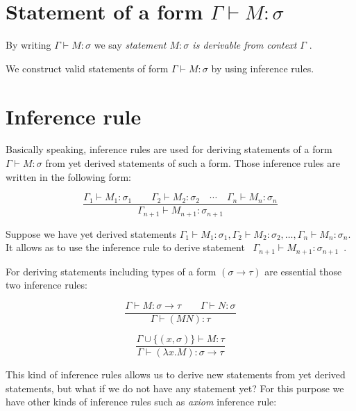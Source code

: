 \documentclass[12pt,a4paper]{report}
\begin{document}
	
	
\section{Statement of a form $\Gamma \vdash M : \sigma$}

	By writing $\Gamma \vdash M : \sigma$ we say 
	{\it statement $M : \sigma$ is derivable from context $\Gamma$ }.

	We construct valid statements of form $\Gamma \vdash M : \sigma$ by using inference rules.
	
		
\section{Inference rule}		
	
	Basically speaking, inference rules are used for deriving statements of a form 
	$\Gamma \vdash M : \sigma$ from yet derived statements of such a form.
	Those inference rules are written in the following form:
	
	\begin{equation*}
		\frac{\Gamma_1 \vdash M_1 : \sigma_1 \qquad
			  \Gamma_2 \vdash M_2 : \sigma_2 \quad
			  \dotsm \quad
		      \Gamma_n \vdash M_n : \sigma_n}
		     {\Gamma_{n+1} \vdash M_{n+1} : \sigma_{n+1}}
	\end{equation*}	
	
	Suppose we have yet derived statements 
	$\Gamma_1 \vdash M_1 : \sigma_1 ,
	 \Gamma_2 \vdash M_2 : \sigma_2 ,
	 \dots ,
	 \Gamma_n \vdash M_n : \sigma_n$. 
	It allows as to use the inference rule to derive statement
	\mbox{ $\Gamma_{n+1} \vdash M_{n+1} : \sigma_{n+1}$ }.
	 
	For deriving statements including types of a form 
	$(\sigma \rightarrow \tau)$ are essential those two 
	inference rules:
	
	\begin{equation*}
		\frac{\Gamma \vdash M : \sigma \rightarrow \tau \qquad
			  \Gamma \vdash N : \sigma }
		     {\Gamma \vdash (M N) : \tau }
	\end{equation*}	
	
	\begin{equation*}
		\frac{\Gamma \cup \{ ( x,\sigma ) \} \vdash M : \tau }
		     {\Gamma \vdash (\lambda x . M) : \sigma \rightarrow \tau }
	\end{equation*}		 
	 
	This kind of inference rules allows us to derive new statements from yet derived statements, but 
	what if we do not have any statement yet? 
	For this purpose we have other kinds of inference rules such as {\it axiom} inference rule:   
	
\end{document}
